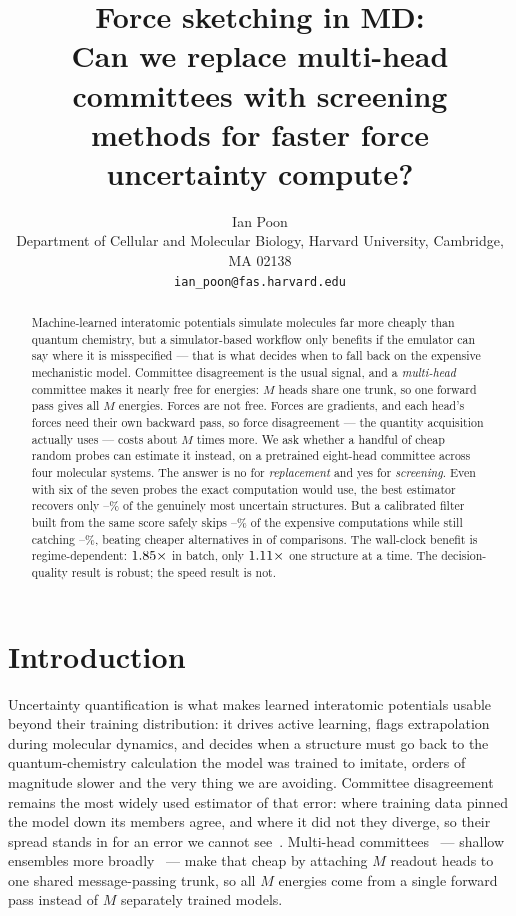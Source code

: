 \documentclass{article}
\title{Force sketching in MD:\\
Can we replace multi-head committees with screening\\
methods for faster force uncertainty compute?}
\author{%
  Ian Poon \\
  Department of Cellular and Molecular Biology, Harvard University, Cambridge, MA 02138 \\
  \texttt{ian\_poon@fas.harvard.edu} \\
}
\begin{document}
\maketitle

\begin{abstract}
Machine-learned interatomic potentials simulate molecules far more cheaply than quantum chemistry,
but a simulator-based workflow only benefits if the emulator can say where it is misspecified ---
that is what decides when to fall back on the expensive mechanistic model. Committee disagreement is the usual signal, and a
\emph{multi-head} committee makes it nearly free for energies: $M$ heads share one trunk, so one
forward pass gives all $M$ energies. Forces are not free. Forces are gradients, and each head's
forces need their own backward pass, so force disagreement --- the quantity acquisition actually
uses --- costs about $M$ times more. We ask whether a handful of cheap random probes can estimate it
instead, on a pretrained eight-head committee across four molecular systems. The answer is no for
\emph{replacement} and yes for \emph{screening}. Even with six of the seven probes the exact
computation would use, the best estimator recovers only
\fsMaxRecallKSixLoPct--\fsMaxRecallKSixHiPct\% of the genuinely most uncertain structures. But a
calibrated filter built from the same score safely skips
\fsGateCVSkipLoPct--\fsGateCVSkipHiPct\% of the expensive computations while still catching
\fsGateCVRecallLoPct--\fsGateCVRecallHiPct\%, beating cheaper alternatives in \fsGateCVDominates{} of
\fsGateCVComparisons{} comparisons. The wall-clock benefit is regime-dependent:
$1.85\times$ in batch, only $1.11\times$ one structure at a
time. The decision-quality result is robust; the speed result is not.
\end{abstract}

\section{Introduction}
Uncertainty quantification is what makes learned interatomic potentials usable beyond their training
distribution: it drives active learning, flags extrapolation during molecular dynamics, and decides
when a structure must go back to the quantum-chemistry calculation the model was trained to imitate,
orders of magnitude slower and the very thing we are avoiding. Committee disagreement remains the
most widely used estimator of that error: where training data pinned the model down its members
agree, and where it did not they diverge, so their spread stands in for an error we cannot
see~\citep{behler2015,podryabinkin2017,carrete2023}. Multi-head
committees~\citep{beck2025mhc} --- shallow ensembles more broadly~\citep{kellner2024} --- make that
cheap by attaching $M$ readout heads to one shared message-passing trunk, so all $M$ energies come
from a single forward pass instead of $M$ separately trained models.
\end{document}
